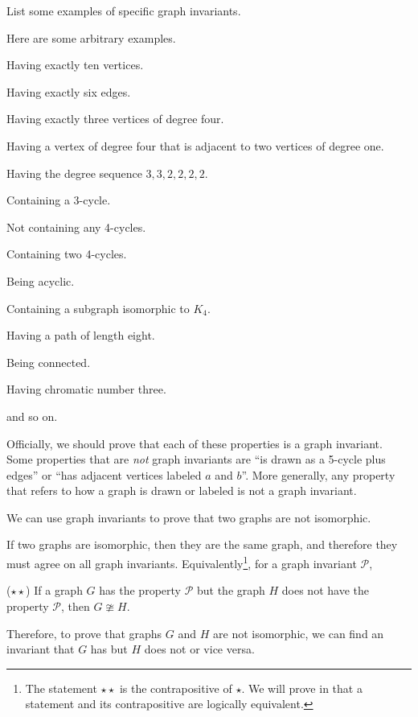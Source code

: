 \begin{exam}
\label{exam_graph_invariants}
  List some examples of specific graph invariants.
     \begin{soln}
         Here are some arbitrary examples.  
             \begin{bull}
                \item Having exactly ten vertices.
                \item Having exactly six edges.
                \item Having exactly three vertices of degree four.
                \item Having a vertex of degree four that is adjacent to two vertices of degree one.
                \item Having the degree sequence $3,3,2,2,2,2$.
                \item Containing a 3-cycle.
                \item Not containing any 4-cycles.
                \item Containing two 4-cycles.
                \item Being acyclic.
                \item Containing a subgraph isomorphic to $K_4$.
                \item Having a path of length eight.
                \item Being connected.
                \item Having chromatic number three.
                \item and so on.
            \end{bull}
        Officially, we should prove that each of these properties is a graph invariant. Some properties that are \emph{not} graph invariants are ``is drawn as a 5-cycle plus edges'' or ``has adjacent vertices labeled $a$ and $b$''.  More generally, any property that refers to how a graph is drawn or labeled is not a graph invariant.
    \end{soln}
\end{exam}

We can use graph invariants to prove that two graphs are not isomorphic.

\begin{rem}
\label{rem_show_not_ism}
    If two graphs are isomorphic, then they are the same graph, and therefore they must agree on all graph invariants. Equivalently\footnote{The statement $\star\star$ is the contrapositive of $\star$.  We will prove in  that a statement and its contrapositive are logically equivalent.}, for a graph invariant $\mathcal{P}$,
        \begin{center} 
            ($\star\star$) If a graph $G$ has the property $\mathcal{P}$ but the graph $H$ does not have the property $\mathcal{P}$, then $G \ncong H$.  
        \end{center}
    Therefore, to prove that graphs $G$ and $H$ are not isomorphic, we can find an invariant that $G$ has but $H$ does not or vice versa.
\end{rem}


